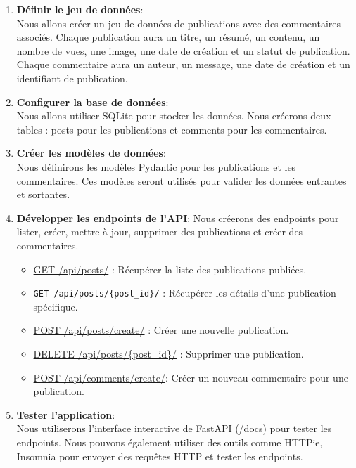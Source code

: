 \documentclass[a4paper,11pt]{article}
\begin{document}
                \begin{enumerate}
                    \item \textbf{Définir le jeu de données}: \\Nous allons créer un jeu de données de publications avec des commentaires associés. Chaque publication aura un titre, un résumé, un contenu, un nombre de vues, une image, une date de création et un statut de publication. Chaque commentaire aura un auteur, un message, une date de création et un identifiant de publication.
                    \item \textbf{Configurer la base de données}:\\ Nous allons utiliser SQLite pour stocker les données. Nous créerons deux tables : posts pour les publications et comments pour les commentaires.
                    \item \textbf{Créer les modèles de données}:\\ Nous définirons les modèles Pydantic pour les publications et les commentaires. Ces modèles seront utilisés pour valider les données entrantes et sortantes.
                    \item \textbf{Développer les endpoints de l'API}: Nous créerons des endpoints pour lister, créer, mettre à jour, supprimer des publications et créer des commentaires.
                        \begin{itemize}
                            \item \underline{GET /api/posts/} : Récupérer la liste des publications publiées.
                            \item \texttt{GET /api/posts/\{post\_id\}/} : Récupérer les détails d'une publication spécifique.
                            \item \underline{POST /api/posts/create/} : Créer une nouvelle publication.
                            \item \underline{DELETE /api/posts/\{post\_id\}/} : Supprimer une publication.
                            \item \underline{POST /api/comments/create/}: Créer un nouveau commentaire pour une publication.
                        \end{itemize}
                    \item \textbf{Tester l'application}: \\ Nous utiliserons l'interface interactive de FastAPI (/docs) pour tester les endpoints. Nous pouvons également utiliser des outils comme HTTPie, Insomnia pour envoyer des requêtes HTTP et tester les endpoints.
                \end{enumerate}
\end{document}
